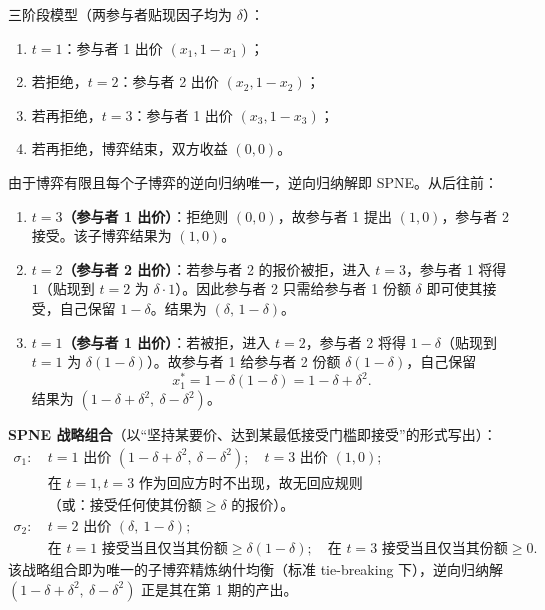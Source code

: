 \sol
三阶段模型（两参与者贴现因子均为 $\delta$）：
\begin{enumerate}[leftmargin=*]
  \item $t=1$：参与者 1 出价 $(x_1,1-x_1)$；
  \item 若拒绝，$t=2$：参与者 2 出价 $(x_2,1-x_2)$；
  \item 若再拒绝，$t=3$：参与者 1 出价 $(x_3,1-x_3)$；
  \item 若再拒绝，博弈结束，双方收益 $(0,0)$。
\end{enumerate}
由于博弈有限且每个子博弈的逆向归纳唯一，逆向归纳解即 SPNE。从后往前：
\begin{enumerate}[leftmargin=*,label=(\roman*)]
  \item \textbf{$t=3$（参与者 1 出价）}：拒绝则 $(0,0)$，故参与者 1 提出 $(1,0)$，参与者 2 接受。该子博弈结果为 $(1,0)$。
  \item \textbf{$t=2$（参与者 2 出价）}：若参与者 2 的报价被拒，进入 $t=3$，参与者 1 将得 $1$（贴现到 $t=2$ 为 $\delta\cdot 1$）。因此参与者 2 只需给参与者 1 份额 $\delta$ 即可使其接受，自己保留 $1-\delta$。结果为 $(\delta,\,1-\delta)$。
  \item \textbf{$t=1$（参与者 1 出价）}：若被拒，进入 $t=2$，参与者 2 将得 $1-\delta$（贴现到 $t=1$ 为 $\delta(1-\delta)$）。故参与者 1 给参与者 2 份额 $\delta(1-\delta)$，自己保留
  \[
  x_1^*=1-\delta(1-\delta)=1-\delta+\delta^2.
  \]\indent
  结果为 $(1-\delta+\delta^2,\ \delta-\delta^2)$。
\end{enumerate}

\textbf{SPNE 战略组合}（以“坚持某要价、达到某最低接受门槛即接受”的形式写出）：
\begin{align*}
\sigma_1:\ &t=1\text{ 出价 }(1-\delta+\delta^2,\ \delta-\delta^2);\quad
            t=3\text{ 出价 }(1,0);\\
           &\text{在 }t=1,t=3\text{ 作为回应方时不出现，故无回应规则}\\[-2pt]
           &\text{（或：接受任何使其份额}\ge\delta\text{ 的报价）。}\\
\sigma_2:\ &t=2\text{ 出价 }(\delta,\ 1-\delta);\\
           &\text{在 }t=1\text{ 接受当且仅当其份额}\ge \delta(1-\delta);\quad
            \text{在 }t=3\text{ 接受当且仅当其份额}\ge 0.
\end{align*}\indent
该战略组合即为唯一的子博弈精炼纳什均衡（标准 tie-breaking 下），逆向归纳解 $(1-\delta+\delta^2,\ \delta-\delta^2)$ 正是其在第 1 期的产出。

